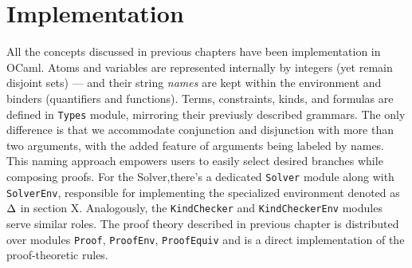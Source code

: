 \documentclass[english, mgr]{iithesis}
\renewcommand{\tt}[1]{\texttt{\small{#1}}}
\renewcommand{\it}[1]{\textit{#1}}
\begin{document}
\chapter{Implementation}
All the concepts discussed in previous chapters have been implementation in OCaml.
Atoms and variables are represented internally by integers (yet remain disjoint sets)
--- and their string \it{names} are kept within the environment and binders
(quantifiers and functions).
Terms, constraints, kinds, and formulas are defined in \tt{Types} module,
mirroring their previusly described grammars.
The only difference is that we accommodate conjunction and disjunction with more than two arguments, with the added feature of arguments being labeled by names. This naming approach empowers users to easily select desired branches while composing proofs.
For the Solver,there's a dedicated \tt{Solver} module along with \tt{SolverEnv},
responsible for implementing the specialized environment denoted as $\Delta$ in section X.
Analogously, the \texttt{KindChecker} and \texttt{KindCheckerEnv} modules serve similar roles.
The proof theory described in previous chapter is distributed over modules
\tt{Proof}, \tt{ProofEnv}, \tt{ProofEquiv} and is a direct implementation of the proof-theoretic rules.
\end{document}
